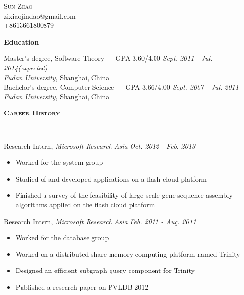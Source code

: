 \documentclass[9pt]{article}
\newenvironment{changemargin}[2]{%
  \begin{list}{}{%
    \setlength{\topsep}{0pt}%
    \setlength{\leftmargin}{#1}%
    \setlength{\rightmargin}{#2}%
    \setlength{\listparindent}{\parindent}%
    \setlength{\itemindent}{\parindent}%
    \setlength{\parsep}{\parskip}%
  }%
  \item[]}{\end{list}
}
\newcommand{\lineover}{
	\begin{changemargin}{-0.05in}{-0.05in}
		\vspace*{-8pt}
		\hrulefill \\
		\vspace*{-2pt}
	\end{changemargin}
}
\newcommand{\header}[1]{
	\begin{changemargin}{-0.5in}{-0.5in}
		\scshape{#1}\\
  	\lineover
	\end{changemargin}
}
\newcommand{\contact}[4]{
	\begin{changemargin}{-0.5in}{-0.5in}
		\begin{center}
			{\Large \scshape {#1}}\\ \smallskip
			{#2}\\ \smallskip
			{#3}\\ \smallskip
			{#4}\smallskip
		\end{center}
	\end{changemargin}
}
\newenvironment{body} {
	\vspace*{-16pt}
	\begin{changemargin}{-0.25in}{-0.5in}
  }	
	{\end{changemargin}
}
\begin{document}
\thispagestyle{empty}
\contact{Sun Zhao}{zixiaojindao@gmail.com}{+8613661800879}


%
%


\header{\textbf{Education}}

\begin{body}
	\vspace{14pt}
	Master's degree, Software Theory --- GPA 3.60/4.00 \hfill \emph{Sept. 2011 - Jul. 2014(expected)} \\
	\emph{Fudan University}, Shanghai, China \\
  \medskip
	Bachelor's degree, Computer Science --- GPA 3.66/4.00 \hfill \emph{Sept. 2007 - Jul. 2011} \\
	\emph{Fudan University}, Shanghai, China\\
\end{body}

\smallskip


\header{\textbf{Career History}}

\begin{body}
	\vspace{14pt}
    Research Intern, \emph{Microsoft Research Asia} \hfill \emph{Oct. 2012 - Feb. 2013}\\
    \vspace*{-4pt}
    \begin{itemize} \itemsep -0pt
    \item Worked for the system group
    \item Studied of and developed applications on a flash cloud platform
    \item Finished a survey of the feasibility of large scale gene sequence assembly algorithms applied on the flash cloud platform
    \end{itemize}

    Research Intern, \emph{Microsoft Research Asia} \hfill \emph{Feb. 2011 - Aug. 2011}\\
    \vspace*{-4pt}
    \begin{itemize} \itemsep -0pt
        \item Worked for the database group
        \item Worked on a distributed share memory computing platform named Trinity
        \item Designed an efficient subgraph query component for Trinity
        \item Published a research paper on PVLDB 2012
    \end{itemize}
\end{body}
\end{document}
